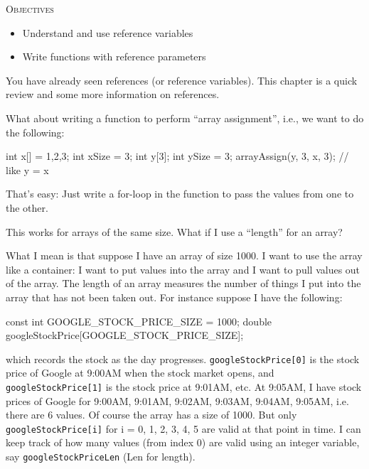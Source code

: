 \newpage{}

\textsc{Objectives}
\begin{itemize}
\item Understand and use reference variables
\item Write functions with reference parameters
\end{itemize}

You have already seen references (or reference variables). This chapter is a quick review and some more information on references.


\newpage{}

What about writing a function to perform ``array assignment'', i.e., we want to do the following:

\begin{consolethree}[escapeinside=||]
int x[] = {1,2,3};
int xSize = 3;
int y[3];
int ySize = 3;
arrayAssign(y, 3, x, 3); // like y = x
\end{consolethree}

That's easy: Just write a for-loop in the function to pass the values from one to the other.

This works for arrays of the same size. What if I use a ``length'' for an array?

What I mean is that suppose I have an array of size 1000. I want to use the array like a container: I want to put values into the array and I want to pull values out of the array. The length of an array measures the number of things I put into the array that has not been taken out. For instance suppose I have the following:

\begin{consolethree}[escapeinside=||]
const int GOOGLE_STOCK_PRICE_SIZE = 1000;
double googleStockPrice[GOOGLE_STOCK_PRICE_SIZE];
\end{consolethree}

which records the stock as the day progresses. \texttt{googleStockPrice[0]} is the stock price of Google at 9:00AM when the stock market opens, and \texttt{googleStockPrice[1]} is the stock price at 9:01AM, etc. At 9:05AM, I have stock prices of Google for 9:00AM, 9:01AM, 9:02AM, 9:03AM, 9:04AM, 9:05AM, i.e. there are 6 values. Of course the array has a size of 1000. But only \texttt{googleStockPrice[i]} for i = 0, 1, 2, 3, 4, 5 are valid at that point in time. I can keep track of how many values (from index 0) are valid using an integer variable, say \texttt{googleStockPriceLen} (Len for length).

